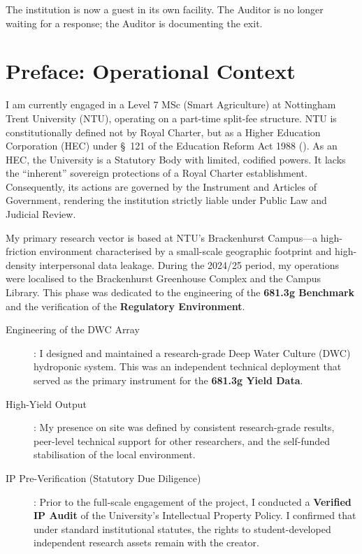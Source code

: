 \documentclass{EMBASSY}
\begin{document}
The institution is now a guest in its own facility. The Auditor is no longer waiting for a response; the Auditor is documenting the exit.


\newpage
\cleardoublepage
{}
\setcounter{page}{1}
\section{Preface: Operational Context}
I am currently engaged in a Level 7 MSc (Smart Agriculture) at Nottingham Trent University (NTU), operating on a part-time split-fee structure. NTU is constitutionally defined not by Royal Charter, but as a Higher Education Corporation (HEC) under \S~121 of the Education Reform Act 1988 (\cite{ERA88}). As an HEC, the University is a Statutory Body with limited, codified powers. It lacks the ``inherent'' sovereign protections of a Royal Charter establishment. Consequently, its actions are governed by the Instrument and Articles of Government, rendering the institution strictly liable under Public Law and Judicial Review.

My primary research vector is based at NTU's Brackenhurst Campus---a high-friction environment characterised by a small-scale geographic footprint and high-density interpersonal data leakage. During the 2024/25 period, my operations were localised to the Brackenhurst Greenhouse Complex and the Campus Library. This phase was dedicated to the engineering of the \textbf{681.3g Benchmark} and the verification of the \textbf{Regulatory Environment}.

\begin{description}
	\item[Engineering of the DWC Array]: I designed and maintained a research-grade Deep Water Culture (DWC) hydroponic system. This was an independent technical deployment that served as the primary instrument for the \textbf{681.3g Yield Data}.
	\item[High-Yield Output]: My presence on site was defined by consistent research-grade results, peer-level technical support for other researchers, and the self-funded stabilisation of the local environment.
	\item[IP Pre-Verification (Statutory Due Diligence)]: Prior to the full-scale engagement of the project, I conducted a \textbf{Verified IP Audit} of the University’s Intellectual Property Policy. I confirmed that under standard institutional statutes, the rights to student-developed independent research assets remain with the creator.
\end{description}
\end{document}
